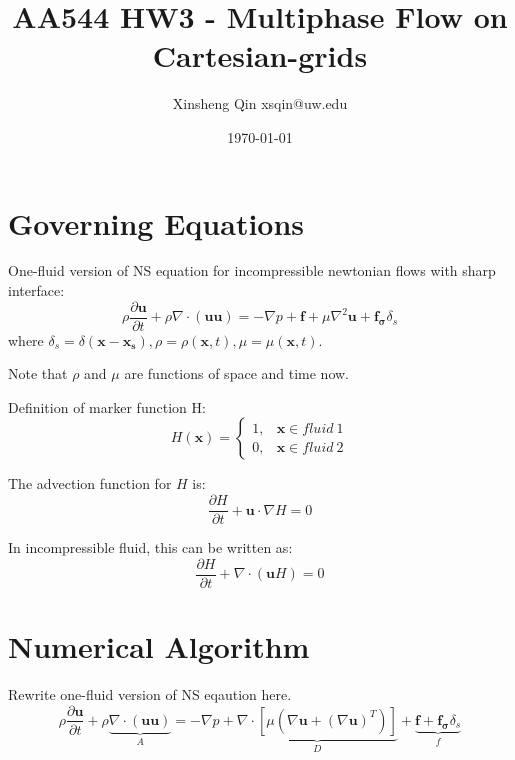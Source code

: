 \documentclass[11pt]{article}
\begin{document}
\title{AA544 HW3 - Multiphase Flow on Cartesian-grids}

\author{Xinsheng Qin xsqin@uw.edu}
\date{\today} %


\maketitle


\newpage
\section{Governing Equations}
One-fluid version of NS equation for incompressible newtonian flows with sharp interface:
\begin{equation}
    \rho\frac{\partial \bm{u}}{\partial t} + \rho \nabla \cdot (\bm{uu}) = - \nabla p + \bm{f} + \mu \nabla^2 \bm{u}  + \bm{f_\sigma}\delta _s
    \label{}
\end{equation}
where $\delta _s = \delta (\bm{x}-\bm{x_s}), \rho = \rho(\bm{x},t), \mu = \mu(\bm{x},t)$.
\par
Note that $\rho$ and $\mu$ are functions of space and time now.

Definition of marker function H:
\begin{equation}
        H(\bm{x}) =
         \begin{cases}
             1, &\bm{x} \in fluid \ 1\\
             0, &\bm{x} \in fluid \ 2
         \end{cases}
    \label{}
\end{equation}

The advection function for $H$ is:
\begin{equation}
    \frac{\partial H}{\partial t} + \bm{u} \cdot \nabla H = 0
    \label{eq:transport_H}
\end{equation}

In incompressible fluid, this can be written as:
\begin{equation}
    \frac{\partial H}{\partial t} + \nabla \cdot (\bm{u}H) = 0
    \label{}
\end{equation}

\section{Numerical Algorithm}
Rewrite one-fluid version of NS eqaution here.
\begin{equation}
\rho\frac{\partial \bm{u}}{\partial t} + \rho \underbrace{ \nabla \cdot (\bm{uu})}_{A} = - \nabla p +  \underbrace{\nabla \cdot \left[\mu \left( \nabla \bm{u} + \left( \nabla \bm{u} \right)^T \right) \right] }_{D} + \underbrace{\bm{f}  + \bm{f_\sigma}\delta _s}_{f}
    \label{}
\end{equation}
\end{document}
